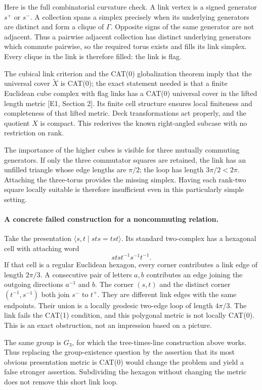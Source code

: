 \documentclass[11pt]{article}
\begin{document}
Here is the full combinatorial curvature check. A link vertex is a signed
generator $s^+$ or $s^-$. A collection spans a simplex precisely when its
underlying generators are distinct and form a clique of $\Gamma$.
Opposite signs of the same generator are not adjacent. Thus a pairwise
adjacent collection has distinct underlying generators which commute
pairwise, so the required torus exists and fills its link simplex. Every
clique in the link is therefore filled: the link is flag.

The cubical link criterion and the CAT(0) globalization theorem imply that
the universal cover $\widetilde X$ is CAT(0); the exact statement needed is
that a finite Euclidean cube complex with flag links has a CAT(0) universal
cover in the lifted length metric [E1, Section 2]. Its finite cell structure
ensures local finiteness and completeness of that lifted metric. Deck
transformations act properly, and the quotient $X$ is compact. This
rederives the known right-angled subcase with no restriction on rank.

The importance of the higher cubes is visible for three mutually commuting
generators. If only the three commutator squares are retained, the link has
an unfilled triangle whose edge lengths are $\pi/2$; the loop has length
$3\pi/2<2\pi$. Attaching the three-torus provides the missing simplex.
Having each rank-two square locally suitable is therefore insufficient
even in this particularly simple setting.

\paragraph{A concrete failed construction for a noncommuting relation.}
Take the presentation $\langle s,t\mid sts=tst\rangle$. Its standard
two-complex has a hexagonal cell with attaching word
\[
 stst^{-1}s^{-1}t^{-1}.
\]
If that cell is a regular Euclidean hexagon, every corner contributes a
link edge of length $2\pi/3$. A consecutive pair of letters $a,b$ contributes
an edge joining the outgoing directions $a^{-1}$ and $b$.
The corner $(s,t)$ and the distinct corner $(t^{-1},s^{-1})$ both join
$s^-$ to $t^+$. They are different link edges with the same endpoints.
Their union is a locally geodesic two-edge loop of length $4\pi/3$.
The link fails the CAT(1) condition, and this polygonal metric is not locally
CAT(0). This is an exact obstruction, not an impression based on a picture.

The same group is $G_3$, for which the tree-times-line construction above
works. Thus replacing the group-existence question by the assertion that
its most obvious presentation metric is CAT(0) would change the problem
and yield a false stronger assertion. Subdividing the hexagon without
changing the metric does not remove this short link loop.
\end{document}
